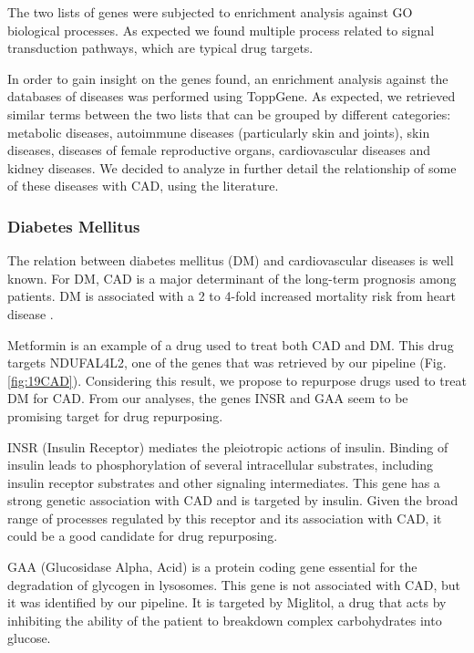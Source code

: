 \documentclass[fleqn,10pt]{SelfArx} %
\begin{document}
The two lists of genes were subjected to enrichment analysis against GO biological processes. As expected we found multiple process related to signal transduction pathways, which are typical drug targets.

In order to gain insight on the genes found, an enrichment analysis against the databases of diseases was performed using ToppGene. As expected, we retrieved similar terms between the two lists that can be grouped by different categories: metabolic diseases, autoimmune diseases (particularly skin and joints), skin diseases, diseases of female reproductive organs, cardiovascular diseases and kidney diseases. We decided to analyze in further detail the relationship of some of these diseases with CAD, using the literature.

\subsubsection*{Diabetes Mellitus}

The relation between diabetes mellitus (DM) and cardiovascular diseases is well known. For DM, CAD is a major determinant of the long-term prognosis among patients. DM is associated with a 2 to 4-fold increased mortality risk from heart disease \cite{diabetes}.

Metformin is an example of a drug used to treat both CAD and DM. This drug targets NDUFAL4L2, one of the genes that was retrieved by our pipeline (Fig. \ref{fig:19CAD}). \cite{metformin} Considering this result, we propose to repurpose drugs used to treat DM for CAD. From our analyses, the genes INSR and GAA seem to be promising target for drug repurposing.

INSR (Insulin Receptor) mediates the pleiotropic actions of insulin. Binding of insulin leads to phosphorylation of several intracellular substrates, including insulin receptor substrates and other signaling intermediates. This gene has a strong  genetic association with CAD and is targeted by insulin. Given the broad range of processes regulated by this receptor and its association with CAD, it could be a good candidate for drug repurposing.

GAA  (Glucosidase Alpha, Acid) is a protein coding gene essential for the degradation of glycogen in lysosomes. This gene is not associated with CAD, but it was identified by our pipeline. It is targeted by Miglitol, a drug that acts by inhibiting the ability of the patient to breakdown complex carbohydrates into glucose.
\end{document}

